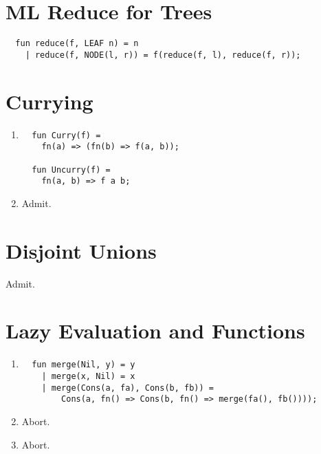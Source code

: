 \section{ML Reduce for Trees}
\begin{verbatim}
  fun reduce(f, LEAF n) = n
    | reduce(f, NODE(l, r)) = f(reduce(f, l), reduce(f, r));
\end{verbatim}


\section{Currying}
\begin{enumerate}
  \item
\begin{verbatim}
  fun Curry(f) =
    fn(a) => (fn(b) => f(a, b));
    
  fun Uncurry(f) =
    fn(a, b) => f a b;
\end{verbatim}

  \item Admit.
\end{enumerate}


\section{Disjoint Unions}
Admit.


\section{Lazy Evaluation and Functions}
\begin{enumerate}
  \item 
\begin{verbatim}
  fun merge(Nil, y) = y
    | merge(x, Nil) = x
    | merge(Cons(a, fa), Cons(b, fb)) = 
        Cons(a, fn() => Cons(b, fn() => merge(fa(), fb())));
\end{verbatim}
  
  \item Abort.
  \item Abort.
\end{enumerate}




